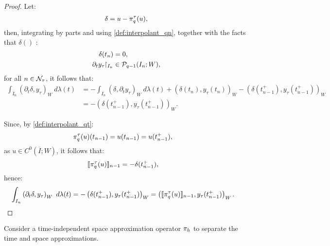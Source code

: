 \begin{proof}
    Let:
    \begin{align*}
        \delta = u - \pi^{\tau}_q(u),
    \end{align*}
    then, integrating by parts and using \cref{def:interpolant_qn}, together with the facts that $\delta()$ :
    \begin{align*}
        \delta(t_n) &= 0, \\
        \partial_t y_{\tau}\!\!\restriction_{I_n} &\in \mathcal{P}_{q - 1}(I_n; W),
    \end{align*}
    for all $n \in \mathcal{N}_{\tau}$, it follows that:
    \begin{align*}
        \int_{I_n} \left( \partial_t \delta, y_{\tau} \right)_W ~ d \lambda(t) &= - \int_{I_n} \left( \delta, \partial_t y_{\tau} \right)_W ~ d \lambda(t) + \left( \delta(t_n), y_{\tau}(t_n) \right)_W - \left( \delta(t_{n - 1}^+), y_{\tau}(t_{n - 1}^+) \right)_W \\
        &= - \left( \delta(t_{n - 1}^+), y_{\tau}(t_{n - 1}^+) \right)_W.
    \end{align*}

    Since, by \cref{def:interpolant_qt}:
    \begin{align*}
        \pi^{\tau}_q(u)(t_{n - 1}) = u(t_{n - 1}) &= u(t_{n - 1}^+),
    \end{align*}
    as $u \in C^0(\overline{I}; W)$, it follows that:
    \begin{align*}
        \llbracket \pi^{\tau}_q(u) \rrbracket_{n - 1} &= - \delta(t_{n - 1}^+),
    \end{align*}
    hence:
    \begin{align*}
        \int_{I_n} \left( \partial_t \delta, y_{\tau} \right)_W ~ d \lambda(t) &= - \left( \delta(t_{n - 1}^+), y_{\tau}(t_{n - 1}^+) \right)_W = \left( \llbracket \pi^{\tau}_q(u) \rrbracket_{n - 1}, y_{\tau}(t_{n - 1}^+) \right)_W.
    \end{align*}
\end{proof}

Consider a time-independent space approximation operator $\pi_h$ to separate the time and space approximations.

